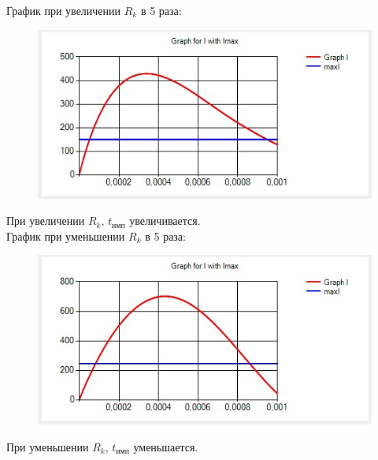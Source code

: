 \documentclass[14pt, a4paper]{extarticle}
\begin{document}
\begin{enumerate}
	График при увеличении $R_k$ в 5 раза:
	\begin{figure}[h]
		\centering
		\includegraphics[scale=1]{source/test4.6.jpg}
	\end{figure}\par
	При увеличении $R_k$, $t_{\text{имп}}$ увеличивается.\\
	\newpage
	График при уменьшении $R_k$ в 5 раза:
	\begin{figure}[h]
		\centering
		\includegraphics[scale=1]{source/test4.7.jpg}
	\end{figure}\par
	При уменьшении $R_k$, $t_{\text{имп}}$ уменьшается.\\
	
\end{enumerate}
\end{document}
